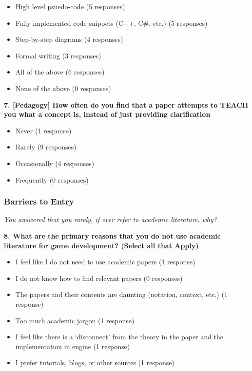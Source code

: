 \begin{itemize}
    \item High level psuedo-code (5 responses)
    \item Fully implemented code snippets (C++, C\#, etc.) (5 responses)
    \item Step-by-step diagrams (4 responses)
    \item Formal writing (3 responses)
    \item All of the above (6 responses)
    \item None of the above (0 responses)
\end{itemize}

\vspace{2em}

\textbf{7. [Pedagogy] How often do you find that a paper attempts to TEACH you what a concept is, instead of just providing clarification}

\begin{itemize}
    \item Never (1 response)
    \item Rarely (9 responses)
    \item Occasionally (4 responses)
    \item Frequently (0 responses)
\end{itemize}


\subsubsection{Barriers to Entry}

\textit{You answered that you rarely, if ever refer to academic literature, why?}

\vspace{1em}

\textbf{8. What are the primary reasons that you do not use academic literature for game development? (Select all that Apply)}

\begin{itemize}
    \item I feel like I do not need to use academic papers (1 response)
    \item I do not know how to find relevant papers (0 responses)
    \item The papers and their contents are daunting (notation, context, etc.) (1 response)
    \item Too much academic jargon (1 response)
    \item I feel like there is a `disconnect' from the theory in the paper and the implementation in engine (1 response)
    \item I prefer tutorials, blogs, or other sources (1 response)
\end{itemize}

